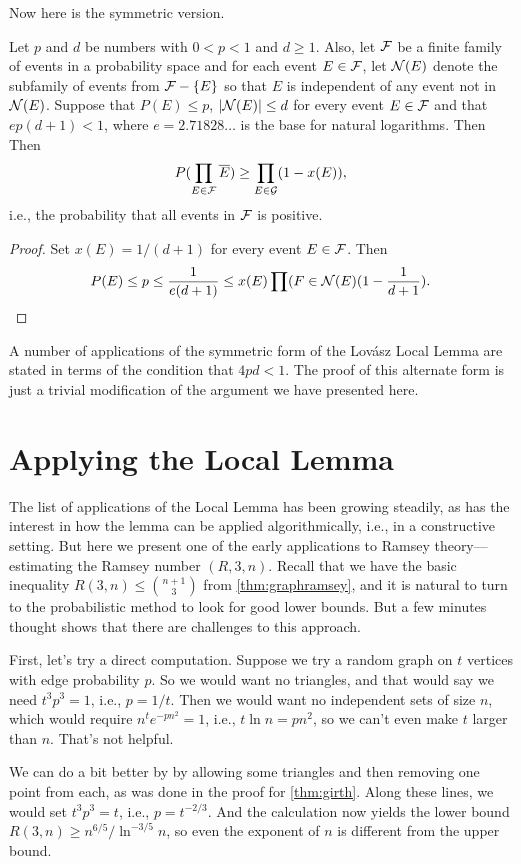 Now here is the symmetric version.

\begin{lemma}\label{lem:LLL-sym}
Let $p$ and $d$ be numbers with $0<p<1$ and $d\ge 1$.  Also,
let $\mathcal{F}$ be a finite family of events in a probability space 
and for each event $E\in\mathcal{F}$, let $\mathcal{N}(E)$ denote the 
subfamily of events from $\mathcal{F}-\{E\}$ so that $E$ is independent of 
any event not in $\mathcal{N}(E)$.  Suppose that $P(E)\le p$, $|\mathcal{N}(E)|\le d$ for 
every event $E\in\mathcal{F}$ and that $ep(d+1)<1$, where 
$e=2.71828\dots$ is the base for natural logarithms.  Then
Then
\[
P(\prod_{E\in\mathcal{F}}\overline{E})\ge\prod_{E\in\mathcal{G}}(1-x(E)),
\]
i.e., the probability that all events in $\mathcal{F}$ is positive.
\end{lemma}
\begin{proof}
Set $x(E)=1/(d+1)$ for every event $E\in\mathcal{F}$.  Then
\[
P(E)\le p\le \frac{1}{e(d+1)}\le x(E)\prod(F\in\mathcal{N}(E)(1-\frac{1}{d+1}).
\]
\end{proof}

A number of applications of the symmetric form of the Lov\'asz Local
Lemma are stated in terms of the condition that $4pd<1$.  The proof
of this alternate form is just a trivial modification of the argument
we have presented here.

\section{Applying the Local Lemma}

The list of applications of the Local Lemma has been growing
steadily, as has the interest in how the lemma can be applied
algorithmically, i.e., in a constructive setting.  But here
we present one of the early applications to Ramsey theory---estimating
the Ramsey number $(R,3,n)$.  Recall that we have the basic inequality 
$R(3,n)\le \binom{n+1}{3}$ from \autoref{thm:graphramsey}, and it is
natural to turn to the probabilistic method to look for good lower bounds.
But a few minutes thought shows that there are challenges to this
approach.

First, let's try a direct computation.  Suppose we try a random graph
on $t$ vertices with edge probability $p$.  So we would want no triangles,
and that would say we need $t^3p^3=1$, i.e., $p=1/t$.  Then we
would want no independent sets of size $n$, which would require
$n^te^{-pn^2}=1$, i.e., $t\ln n=pn^2$, so we can't even make
$t$ larger than $n$.  That's not helpful.

We can do a bit better by by allowing some triangles and then removing
one point from each, as was done in the proof for
\autoref{thm:girth}. Along these lines, we would
set $t^3p^3=t$, i.e., $p=t^{-2/3}$.  And the calculation now
yields the lower bound $R(3,n)\ge n^{6/5}/\ln^{-3/5} n$, so even
the exponent of $n$ is different from the upper bound.

